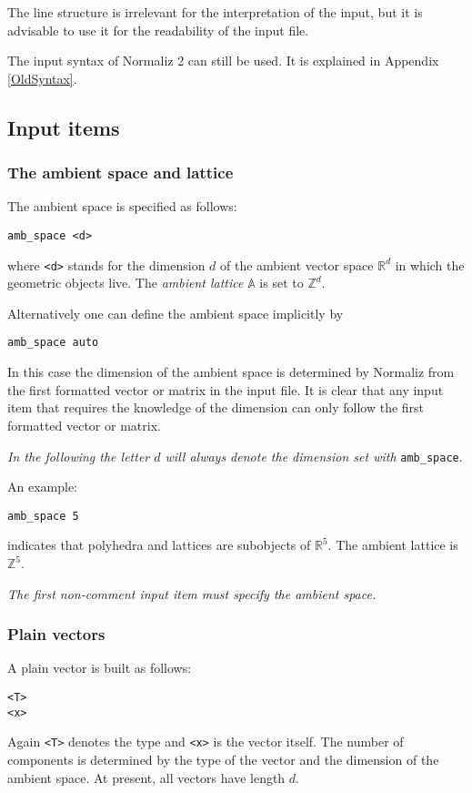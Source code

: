 \documentclass[12pt,a4paper]{scrartcl}
\theoremstyle{definition}
\def\ZZ{{\mathbb Z}}
\def\RR{{\mathbb R}}
\def\AA{{\mathbb A}}
\def\ttt{\texttt}
\begin{document}
The line structure is irrelevant for the interpretation of the input, but it is advisable to use it for the readability of the input file.

The input syntax of Normaliz 2 can still be used. It is explained in Appendix \ref{OldSyntax}.

\subsection{Input items}

\subsubsection{The ambient space and lattice}

The ambient space is specified as follows:
\begin{Verbatim}
amb_space <d>
\end{Verbatim}
where \ttt{<d>} stands for the dimension $d$ of the ambient vector space $\RR^d$ in which the geometric objects live.  The \emph{ambient lattice} $\AA$ is set to $\ZZ^d$. 

Alternatively one can define the ambient space implicitly by
\begin{Verbatim}
amb_space auto
\end{Verbatim}
In this case the dimension of the ambient space is determined by Normaliz from the first formatted vector or matrix in the input file. It is clear that any input item that requires the knowledge of the dimension can only follow the first formatted vector or matrix.

\emph{In the following the letter $d$ will always denote the dimension set with} \verb|amb_space|.


An example:
\begin{Verbatim}
amb_space 5
\end{Verbatim}
indicates that polyhedra and lattices are subobjects of $\RR^5$. The ambient lattice is $\ZZ^5$. 

\emph{The first non-comment input item must specify the ambient space.}

\subsubsection{Plain vectors}

A plain vector is built as follows:
\begin{Verbatim}
<T>
<x>
\end{Verbatim}
Again \ttt{<T>} denotes the type and \ttt{<x>} is the vector itself. The number of components is determined by the type of the vector and the dimension of the ambient space. At present, all vectors have length $d$.
\end{document}
